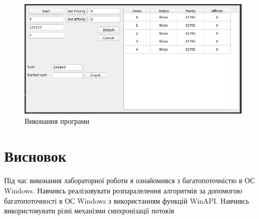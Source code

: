 \documentclass{article}
\begin{document}
\begin{normalsize}
	\begin{figure}[H]
		\centering
		\includegraphics[scale=0.6]{v}
		\caption{Виконання програми}
	\end{figure}
	
	\section*{Висновок}
	Під час виконання лабораторної роботи я ознайомився з багатопоточністю в ОС Windows. Навчивсь
	реалізовувати розпаралелення алгоритмів за допомогою багатопоточності в ОС
	Windows з використанням функцій WinAPI. Навчивсь використовувати різні
	механізми синхронізації потоків
	
	 
\end{normalsize}
\end{document}
